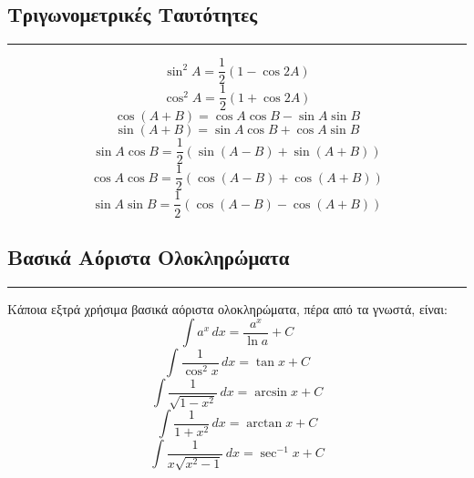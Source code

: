 \documentclass[a4paper,12pt]{article}
\begin{document}
\subsection*{Τριγωνομετρικές Ταυτότητες}
\hrule
\vspace{0.5em}
\[
\sin^2 A = \frac{1}{2}(1-\cos 2A)
\]
\[
\cos^2 A = \frac{1}{2}(1+\cos 2A)
\]
\[
\cos(A+B) = \cos A \cos B - \sin A \sin B
\]
\[
\sin(A+B) = \sin A \cos B + \cos A \sin B
\]
\[
\sin A \cos B = \frac{1}{2}(\sin(A-B) + \sin(A+B))
\]
\[
\cos A \cos B = \frac{1}{2}(\cos(A-B) + \cos(A+B))
\]
\[
\sin A \sin B = \frac{1}{2}(\cos(A-B) - \cos(A+B))
\]


\subsection*{Βασικά Αόριστα Ολοκληρώματα}
\hrule
\vspace{0.5em}
Κάποια εξτρά χρήσιμα βασικά αόριστα ολοκληρώματα, πέρα από τα γνωστά, είναι:
\[
\int a^x\,dx = \frac{a^x}{\ln a} + C
\]
\[
\int \frac{1}{\cos^2 x}\,dx = \tan x + C
\]
\[
\int \frac{1}{\sqrt{1-x^2}}\,dx = \arcsin x + C
\]
\[
\int \frac{1}{1+x^2}\,dx = \arctan x + C
\]
\[
\int \frac{1}{x\sqrt{x^2-1}}\,dx = \sec^{-1} x + C
\]
\end{document}
